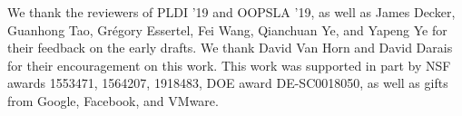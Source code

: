 \documentclass[acmsmall, screen]{acmart}\settopmatter{}
\begin{document}










\begin{acks}                            %
  We thank the reviewers of PLDI '19 and OOPSLA '19, as well as James Decker,
  Guanhong Tao, Gr\'egory Essertel, Fei Wang, Qianchuan Ye, and Yapeng Ye for
  their feedback on the early drafts. We thank David Van Horn and David Darais
  for their encouragement on this work.
  This work was supported in part by NSF awards 1553471, 1564207, 1918483, DOE
  award DE-SC0018050, as well as gifts from Google, Facebook, and VMware.
  
  \iffalse
  This material is based upon work supported by the
  \grantsponsor{GS100000001}{National Science
    Foundation}{http://dx.doi.org/10.13039/100000001} under Grant
  No.~\grantnum{GS100000001}{nnnnnnn} and Grant
  No.~\grantnum{GS100000001}{mmmmmmm}.  Any opinions, findings, and
  conclusions or recommendations expressed in this material are those
  of the author and do not necessarily reflect the views of the
  National Science Foundation.
  \fi
\end{acks}




\end{document}
